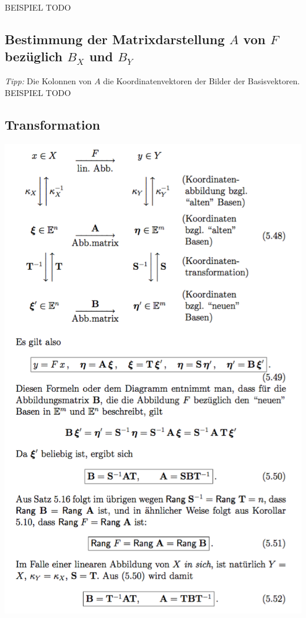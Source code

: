 \documentclass[11pt]{article}
\begin{document}
BEISPIEL TODO

\subsection{Bestimmung der Matrixdarstellung $A$ von $F$ bezüglich $B_X$ und $B_Y$}

\emph{Tipp:} Die Kolonnen von $A$ die Koordinatenvektoren der Bilder der Basisvektoren.
BEISPIEL TODO


\subsection{Transformation}
\begin{center}
	\includegraphics[width=400pt]{images/transformation}
\end{center}
\end{document}
